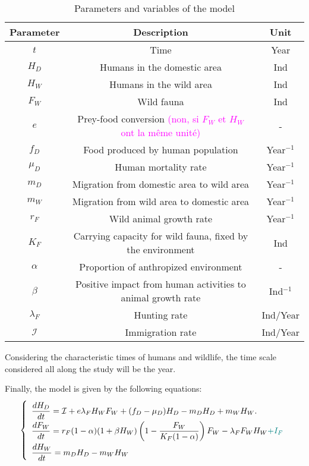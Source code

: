 \documentclass{article}
\newcommand{\lfw}{\lambda_{F}}
\newcommand{\lfw}{\lambda_{F}}
\newcommand{\cI}{\mathcal{I}}
\newcommand{\marc}[1]{\textcolor{teal}{#1}}
\newcommand{\YD}[1]{\textcolor{magenta}{#1}}
\begin{document}
\begin{table}[ht]
\center
\begin{tabular}{|c|c|c|}
\hline 
Parameter & Description & Unit \\ 
\hline \hline
$t$ & Time & Year \\
\hline
$H_D$ & Humans in the domestic area & Ind \\
$H_W$ & Humans in the wild area & Ind \\
$F_W$ & Wild fauna & Ind \\
\hline
$e$ & Prey-food conversion \YD{(non, si $F_W$ et $H_W$ ont la même unité)} & - \\
$f_D$ & Food produced by human population & Year$^{-1}$ \\
$\mu_D$ & Human mortality rate  & Year$^{-1}$ \\
$m_D$ & Migration from domestic area to wild area & Year$^{-1}$ \\
$m_W$ & Migration from wild area to domestic area & Year$^{-1}$ \\
$r_F$ & Wild animal growth rate & Year$^{-1}$ \\
$K_F$ & Carrying capacity for wild fauna, fixed by the environment& Ind \\
$\alpha$ & Proportion of anthropized environment & - \\
$\beta$ & Positive impact from human activities to animal growth rate & Ind$^{-1}$  \\
$\lfw$ & Hunting rate & Ind/Year\\
$\mathcal{I}$ & Immigration rate &Ind/Year\\
\hline
\end{tabular}
\caption{Parameters and variables of the model}
\end{table}

Considering the characteristic times of humans and wildlife, the time scale considered all along the study will be the year.
\medskip

Finally, the model is given by the following equations:
\begin{equation}
\def\arraystretch{2}
\left\{ 
\begin{array}{l}
\dfrac{dH_D}{dt}= \cI + e\lfw H_W F_W + (f_D - \mu_D) H_D - m_D H_D + m_W H_W. \\
\dfrac{dF_W}{dt} = r_F(1- \alpha) (1+ \beta H_W) \left(1 - \dfrac{F_W}{K_F(1-\alpha)} \right) F_W - \lfw F_W H_W \marc{+I_F}\\
\dfrac{dH_W}{dt}= m_D H_D - m_W H_W 
\end{array} \right.
\label{equationsHDFWHW}
\end{equation}
\end{document}
